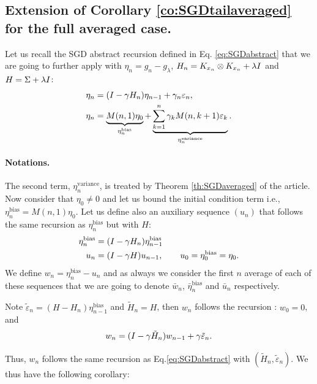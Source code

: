 \subsection{Extension of Corollary \ref{co:SGDtailaveraged} for the full averaged case.}
\label{ap:SGDfullaverage}

Let us recall the SGD abstract recursion defined in Eq. \eqref{eq:SGDabstract} that we are going to further apply with $\eta_n = g_n - g_\lambda$, $H_n = K_{x_n} \otimes K_{x_n} + \lambda I$ and $H = \Sigma + \lambda I$: 
\begin{align*}
   \eta_n &= ( I - \gamma H_n) \eta_{n-1} + \gamma_n \varepsilon_n, \\
 \eta_n &= 
\underbrace{M(n,1)  \eta_0}_{\eta_n^{\textrm {bias}}} + \underbrace{\sum_{k=1}^n \gamma_k M(n,k+1) \varepsilon_k}_{\eta_n^{\textrm {variance}}}.
\end{align*}
\paragraph{Notations.} The second term, $\eta_n^{\textrm {variance}}$, is treated by Theorem \ref{th:SGDaveraged} of the article. Now consider that $\eta_0 \neq 0$ and let us bound the initial condition term i.e., $\eta_n^{\textrm {bias}} = M(n,1)  \eta_0$. Let us define also an auxiliary sequence $(u_n)$ that follows the same recursion as $\eta_n^{\textrm {bias}}$ but with $H$:
\begin{align*}
\eta_n^{\textrm {bias}} & = (I - \gamma H_n)\eta_{n-1}^{\textrm {bias}} \\
u_n & = (I - \gamma H)u_{n-1}, \qquad u_0 = \eta_{0}^{\textrm {bias}} = \eta_0.
\end{align*}
We define $w_n = \eta_n^{\textrm {bias}} - u_n$ and as always we consider the first $n$ average of each of these sequences that we are going to denote $\bar{w}_n$, $\bar{\eta}^{\textrm {bias}}_n$ and $\bar{u}_n$ respectively. 

Note $\tilde{\varepsilon}_n = (H-H_n) \eta_{n-1}^{\textrm {bias}}$ and $\tilde{H}_n = H$, then $w_n$ follows the recursion : $w_0 = 0$, and
\begin{align} 
\label{eq:auxiliarysequence}
w_n = (I - \gamma \tilde{H}_n)w_{n-1} + \gamma \tilde{\varepsilon}_n .
\end{align}

Thus, $w_n$ follows the same recursion as Eq.\eqref{eq:SGDabstract} with $( \tilde{H}_n, \tilde{\varepsilon}_n)$. We thus have the following corollary:

